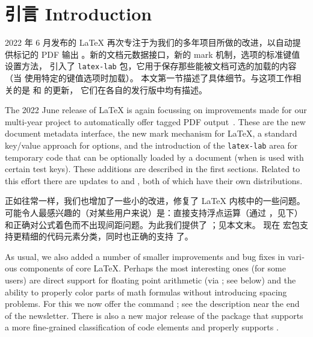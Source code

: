 \documentclass{ltnews}
\makeatletter
\renewcommand{\maketitle}{%
   \twocolumn[{%
      \parbox[t][7\baselineskip]{\textwidth}{%
         \@titlefont\@title\\[\medskipamount]
         \normalfont\normalsize\issuename~\@issue, \@year~年~\@month~月
      }%
   }]%
   \thispagestyle{titlepage}
}
\providecommand\tubcommand[1]{}
\def\LATEX{\LaTeX}
\makeatother
\begin{document}
\tubcommand{\addtolength\textheight{4.2pc}}   %

\maketitle
{\raggedright {}  \spaceskip=3.33pt 
\tableofcontents}

\setlength{}


\medskip


\section{引言 Introduction}

2022 年 6 月发布的 \LATEX{} 再次专注于为我们的多年项目所做的改进，以自动提供标记的 PDF 输出
\cite{35:blueprint}。新的文档元数据接口，新的 mark 机制，选项的标准键值设置方法，
引入了 \texttt{latex-lab} 包，它用于保存那些能被文档可选的加载的内容
（当  使用特定的键值选项时加载）。
本文第一节描述了具体细节。与这项工作相关的是  和  的更新，
它们在各自的发行版中均有描述。

\begin{english}
The 2022 June release of \LaTeX{} is again focussing on improvements
made for our multi-year project to automatically offer tagged PDF
output~\cite{35:blueprint}. These are the new document metadata
interface, the new mark mechanism for \LaTeX{}, a standard key/value
approach for options, and the introduction of the \texttt{latex-lab}
area for temporary code that can be optionally loaded by a document
(when  is used with certain test keys). These
additions are described in the first sections.  Related to this effort
there are updates to  and , both of which
have their own distributions.
\end{english}

正如往常一样，我们也增加了一些小的改进，修复了 \LaTeX{} 内核中的一些问题。
可能令人最感兴趣的（对某些用户来说）是：直接支持浮点运算（通过 ，见下）
和正确对公式着色而不出现间距问题。为此我们提供了 ；见本文末。
现在  宏包支持更精细的代码元素分类，同时也正确的支持  了。

\begin{english}
As usual, we also added a number of smaller improvements and bug
fixes in various components of core \LaTeX{}. Perhaps the most
interesting ones (for some users) are direct support for floating
point arithmetic (via ; see below) and the ability to
properly color parts of math formulas without introducing spacing
problems. For this we now offer the command ; see the
description near the end of the newsletter.  There is also a new major
release of the  package that supports a more fine-grained
classification of code elements and properly supports .
\end{english}
\end{document}
